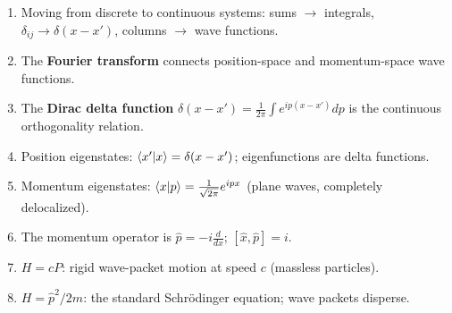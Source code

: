 \documentclass[12pt,a4paper]{article}
\begin{document}
\begin{enumerate}[nosep]
    \item Moving from discrete to continuous systems: sums $\to$ integrals, $\delta_{ij}\to\delta(x-x')$, columns $\to$ wave functions.
    \item The \textbf{Fourier transform} connects position-space and momentum-space wave functions.
    \item The \textbf{Dirac delta function} $\delta(x-x')=\frac{1}{2\pi}\int e^{ip(x-x')}dp$ is the continuous orthogonality relation.
    \item Position eigenstates: $\braket{x'}{x}=\delta(x-x')$; eigenfunctions are delta functions.
    \item Momentum eigenstates: $\braket{x}{p}=\frac{1}{\sqrt{2\pi}}e^{ipx}$ (plane waves, completely delocalized).
    \item The momentum operator is $\hat{p}=-i\frac{d}{dx}$; $[\hat{x},\hat{p}]=i$.
    \item $H=cP$: rigid wave-packet motion at speed $c$ (massless particles).
    \item $H=\hat{p}^2/2m$: the standard Schr\"odinger equation; wave packets disperse.
\end{enumerate}
\end{document}
